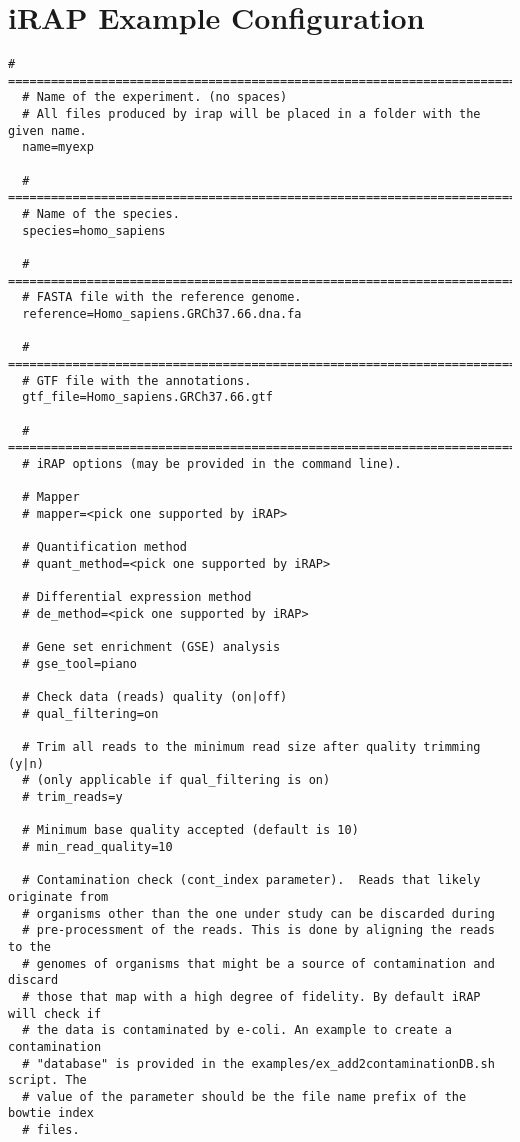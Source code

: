 \chapter{iRAP Example Configuration}\label{appendix:irapconfig}

\begin{lstlisting}[numbers=none, breaklines=true]
  # =============================================================================
  # Name of the experiment. (no spaces)
  # All files produced by irap will be placed in a folder with the given name.
  name=myexp

  # =============================================================================
  # Name of the species.
  species=homo_sapiens

  # =============================================================================
  # FASTA file with the reference genome.
  reference=Homo_sapiens.GRCh37.66.dna.fa

  # =============================================================================
  # GTF file with the annotations.
  gtf_file=Homo_sapiens.GRCh37.66.gtf

  # =============================================================================
  # iRAP options (may be provided in the command line).

  # Mapper
  # mapper=<pick one supported by iRAP>

  # Quantification method
  # quant_method=<pick one supported by iRAP>

  # Differential expression method
  # de_method=<pick one supported by iRAP>

  # Gene set enrichment (GSE) analysis
  # gse_tool=piano

  # Check data (reads) quality (on|off)
  # qual_filtering=on

  # Trim all reads to the minimum read size after quality trimming (y|n)
  # (only applicable if qual_filtering is on)
  # trim_reads=y

  # Minimum base quality accepted (default is 10)
  # min_read_quality=10

  # Contamination check (cont_index parameter).  Reads that likely originate from
  # organisms other than the one under study can be discarded during
  # pre-processment of the reads. This is done by aligning the reads to the
  # genomes of organisms that might be a source of contamination and discard
  # those that map with a high degree of fidelity. By default iRAP will check if
  # the data is contaminated by e-coli. An example to create a contamination
  # "database" is provided in the examples/ex_add2contaminationDB.sh script. The
  # value of the parameter should be the file name prefix of the bowtie index
  # files.


\end{lstlisting}
